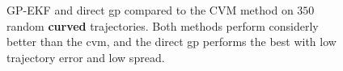 \begin{figure}
    \vspace{0.5cm}

    \caption{GP-EKF and direct \acrshort{gp} compared to the CVM method on $350$ random \textbf{curved} trajectories. Both methods perform considerly better than the \acrshort{cvm}, and the direct \acrshort{gp} performs the best with low trajectory error and low spread.}
    \label{fig:stats_straight_vs_cvm}
\end{figure}

